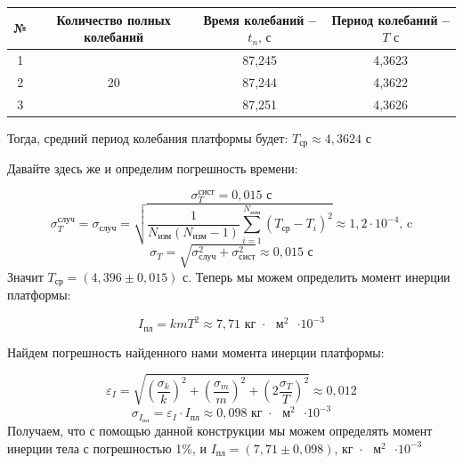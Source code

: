 \documentclass[a4paper,12pt]{article}
\begin{document}
	\begin{table}[!h]
		\begin{center}
			\begin{tabular}{|c|c|c|c|}
				\hline
				№ & Количество полных колебаний & Время колебаний -- $t_n \text{, с}$ & Период колебаний -- $T\text{ с}$\\
				\hline
				1 & \multirow{3}{*}{20} & 87,245 & 4,3623\\
				\cline{1-1} \cline{3-4}
				2 &  & 87,244 & 4,3622\\
				\cline{1-1} \cline{3-4}
				3 & & 87,251 & 4,3626\\
				\hline
			\end{tabular}
		\end{center}
	\end{table}
	
	Тогда, средний период колебания платформы будет: $T_\text{ср} \approx 4,3624\text{ с}$
	
	Давайте здесь же и определим погрешность времени: 
	
	\begin{equation}
		\sigma_T^{\text{сист}} = 0,015\text{ с}
	\end{equation}
	\begin{equation}
		\sigma_T^{\text{случ}} = \sigma_\text{случ}=\sqrt{\frac{1}{  N_\text{изм} \left( N_\text{изм} - 1 \right)}\sum_{i=1}^{N_\text{изм}}\left( T_\text{ср} - T_i \right)^2 } \approx 1,2\cdot 10^{-4}\text{, c}
	\end{equation}
	\begin{equation}
		\sigma_T = \sqrt{\sigma_\text{случ}^{2} + \sigma_{\text{сист}}^{2}} \approx 0,015\text{ с}
	\end{equation}
	Значит $T_\text{ср} = \left(4,396 \pm 0,015\right)\text{ с}$. Теперь мы можем определить момент инерции платформы:
	
	\begin{equation}
			I_\text{пл} = kmT^2 \approx 7,71  \text{ кг $\cdot$ $\text{м}^2$ $\cdot 10^{-3}$}  
	\end{equation}

	Найдем погрешность найденного нами момента инерции платформы:
	
	\begin{equation}
		\varepsilon_I = \sqrt{ \left(\frac{\sigma_k}{k}\right)^2 +\left(\frac{\sigma_m}{m}\right)^2 + \left(2\frac{\sigma_T}{T}\right)^2} \approx 0,012
	\end{equation}
	\begin{equation}
		\sigma_{I_\text{пл}} = \varepsilon_I \cdot I_\text{пл} \approx 0,098 \text{  кг $\cdot$ $\text{м}^2$ $\cdot 10^{-3}$}
	\end{equation}
	Получаем, что с помощью данной конструкции мы можем определять момент инерции тела с погрешностью 1\%, и $I_\text{пл} = \left(7,71 \pm 0,098\right) \text{,  кг $\cdot$ $\text{м}^2$ $\cdot 10^{-3}$}$
	
\end{document}
